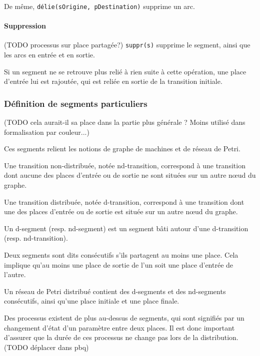 De même, \texttt{délie(sOrigine, pDestination)} supprime un arc.

\paragraph{Suppression}
(TODO processus sur place partagée?)
\texttt{suppr(s)} supprime le segment, ainsi que les arcs en entrée et en sortie.

Si un segment ne se retrouve plus relié à rien suite à cette opération, une place d'entrée lui est rajoutée, qui est reliée en sortie de la transition initiale.

\subsubsection{Définition de segments particuliers}
(TODO cela aurait-il sa place dans la partie plus générale ? Moins utilisé dans formalisation par couleur...)

Ces segments relient les notions de graphe de machines et de réseau de Petri.
\begin{mydef}
Une transition non-distribuée, notée nd-transition, correspond à une transition dont aucune des places d'entrée ou de sortie ne sont situées sur un autre nœud du graphe.
\end{mydef}

\begin{mydef}
Une transition distribuée, notée d-transition, correspond à une transition dont une des places d'entrée ou de sortie est située sur un autre nœud du graphe.
\end{mydef}

\begin{mydef}
Un d-segment (resp. nd-segment) est un segment bâti autour d'une d-transition (resp. nd-transition).
\end{mydef}

\begin{mydef}
Deux segments sont dits consécutifs s'ils partagent au moins une place. Cela implique qu'au moins une place de sortie de l'un soit une place d'entrée de l'autre.
\end{mydef}

Un réseau de Petri distribué contient des d-segments et des nd-segments consécutifs, ainsi qu'une place initiale et une place finale.

Des processus existent de plus au-dessus de segments, qui sont signifiés par un changement d'état d'un paramètre entre deux places. Il est donc important d'assurer que la durée de ces processus ne change pas lors de la distribution. (TODO déplacer dans pbq)

